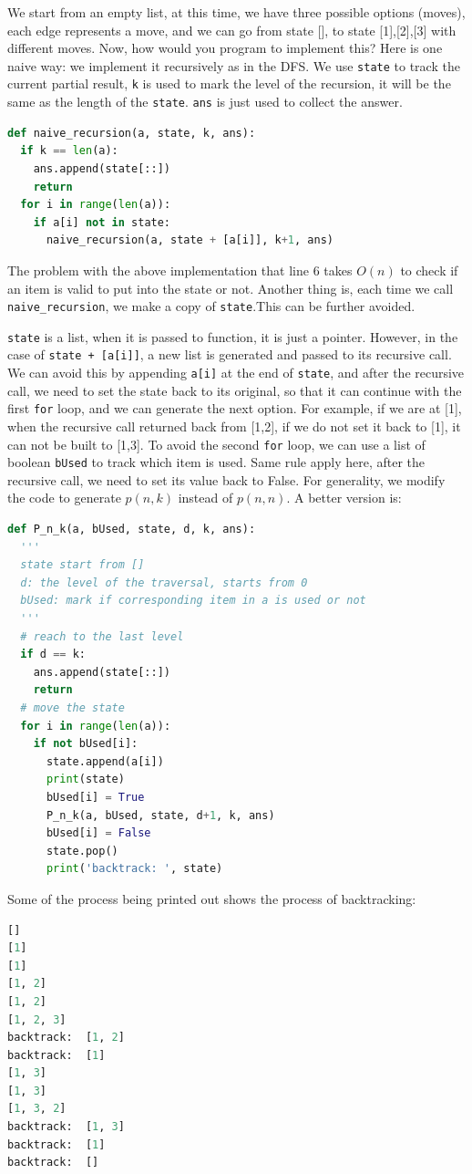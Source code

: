 \documentclass[../main.tex]{subfiles}
\begin{document}
We start from an empty list, at this time, we have three possible options (moves), each edge represents a move, and we can go from state [], to state [1],[2],[3] with different moves. Now, how would you program to implement this? Here is one naive way: we implement it recursively as in the DFS. We use \texttt{state} to track the current partial result, \texttt{k} is used to mark the level of the recursion, it will be the same as the length of the \texttt{state}. \texttt{ans} is just used to collect the answer.
\begin{lstlisting}[language=Python]
def naive_recursion(a, state, k, ans):
  if k == len(a):
    ans.append(state[::])
    return
  for i in range(len(a)):
    if a[i] not in state:
      naive_recursion(a, state + [a[i]], k+1, ans)
\end{lstlisting}
The problem with the above implementation that line $6$ takes $O(n)$ to check if an item is valid to put into the state or not. Another thing is, each time we call \texttt{naive\_recursion}, we make a copy of \texttt{state}.This can be further avoided.

\texttt{state} is a list, when it is passed to function, it is just a pointer. However, in the case of \texttt{state + [a[i]]}, a new list is generated and passed to its recursive call. We can avoid this by appending \texttt{a[i]} at the end of \texttt{state}, and after the recursive call, we need to set the state back to its original, so that it can continue with the first \texttt{for} loop, and we can generate the next option. For example, if we are at [1], when the recursive call returned back from [1,2], if we do not set it back to [1], it can not be built to [1,3]. To avoid the second \texttt{for} loop, we can use a list of boolean \texttt{bUsed} to track which item is used. Same rule apply here, after the recursive call, we need to set its value back to False. For generality, we modify the code to generate $p(n,k)$ instead of $p(n,n)$. A better version is:
\begin{lstlisting}[language=Python]
def P_n_k(a, bUsed, state, d, k, ans):
  '''
  state start from []
  d: the level of the traversal, starts from 0
  bUsed: mark if corresponding item in a is used or not
  '''
  # reach to the last level
  if d == k:
    ans.append(state[::])
    return
  # move the state
  for i in range(len(a)):
    if not bUsed[i]:
      state.append(a[i])
      print(state)
      bUsed[i] = True
      P_n_k(a, bUsed, state, d+1, k, ans)
      bUsed[i] = False
      state.pop()
      print('backtrack: ', state)
\end{lstlisting}
Some of the process being printed out shows the process of backtracking:
\begin{lstlisting}[language=Python]
[]
[1]
[1]
[1, 2]
[1, 2]
[1, 2, 3]
backtrack:  [1, 2]
backtrack:  [1]
[1, 3]
[1, 3]
[1, 3, 2]
backtrack:  [1, 3]
backtrack:  [1]
backtrack:  []
\end{lstlisting}
\end{document}
